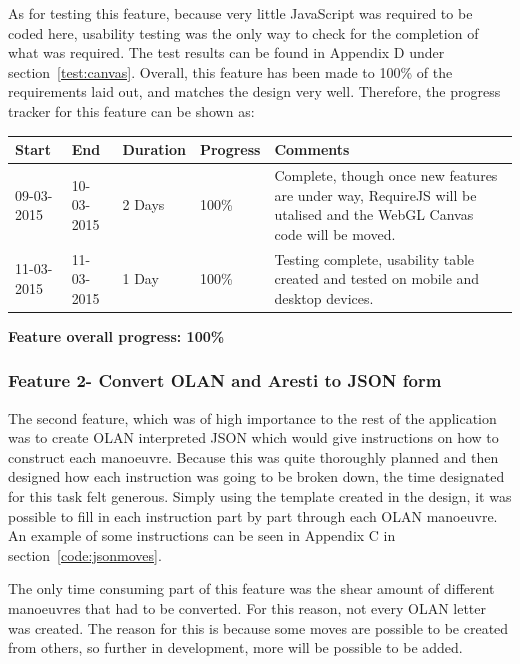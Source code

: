 As for testing this feature, because very little JavaScript was required to be coded here, usability testing was the only way to check for the completion of what was required. The test results can be found in Appendix D under section~\ref{test:canvas}. Overall, this feature has been made to 100\% of the requirements laid out, and matches the design very well. Therefore, the progress tracker for this feature can be shown as:

\begin{table}[h]
\begin{tabular}{|l|l|l|l|p{7cm}|}
\hline
\textbf{Start} & \textbf{End} & \textbf{Duration} & \textbf{Progress} & \textbf{Comments}                                                                                                     \\ \hline
09-03-2015     & 10-03-2015   & 2 Days            & 100\%             & Complete, though once new features are under way, RequireJS will be utalised and the WebGL Canvas code will be moved. \\ \hline
11-03-2015     & 11-03-2015   & 1 Day            & 100\%             & Testing complete, usability table created and tested on mobile and desktop devices.\\ \hline
\end{tabular}
\end{table}

\textbf{Feature overall progress: 100\%}

\subsubsection{Feature 2- Convert OLAN and Aresti to JSON form}
The second feature, which was of high importance to the rest of the application was to create OLAN interpreted JSON which would give instructions on how to construct each manoeuvre. Because this was quite thoroughly planned and then designed how each instruction was going to be broken down, the time designated for this task felt generous. Simply using the template created in the design, it was possible to fill in each instruction part by part through each OLAN manoeuvre. An example of some instructions can be seen in Appendix C in section~\ref{code:jsonmoves}.

The only time consuming part of this feature was the shear amount of different manoeuvres that had to be converted. For this reason, not every OLAN letter was created. The reason for this is because some moves are possible to be created from others, so further in development, more will be possible to be added. 

